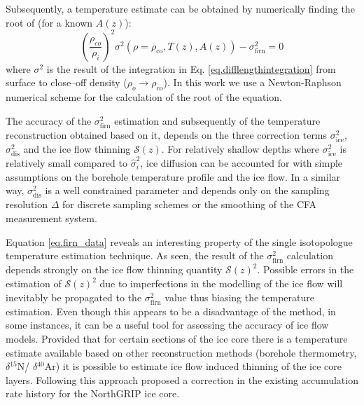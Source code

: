\documentclass[11pt, draftcls, onecolumn]{IEEEtran} %
\numberwithin{equation}{section}
\numberwithin{table}{section}
\numberwithin{figure}{section}
\newcommand{\delN}{$\delta{}^{15}\mathrm{N}$}
\newcommand{\delAr}{$\delta{}^{40}\mathrm{Ar}$}
\begin{document}
Subsequently, a temperature estimate can be obtained by numerically finding the root of (for a known $A(z)$):
\begin{equation}
\label{eq:T_reconstruction}
\left(\frac{\rho_{co}}{\rho_i} \right)^2  \sigma^2(\rho = \rho_{\mathrm{co}},T(z), A(z)) - \sigma^2_\text{firn} = 0 
\end{equation}
where $\sigma^2$ is the result of the integration in Eq. \ref{eq.difflengthintegration} from surface to 
close--off density ($\rho_o  \rightarrow \rho_{\mathrm{co}}$). In this work we use a Newton-Raphson numerical scheme 
\citep{RECIPES} for the calculation of the root of the equation.



The accuracy of the $\sigma^2_\text{firn}$ estimation and subsequently 
of the temperature reconstruction 
obtained based on it, depends on the three correction terms  $\sigma^2_{\mathrm{ice}}$, 
$\sigma^2_{\mathrm{dis}}$ and the ice flow thinning $\mathcal{S}(z)$. For relatively shallow depths 
where $\sigma^2_{\mathrm{ice}}$
is relatively small compared to $\widehat{\sigma}_i^2$, ice diffusion can be accounted for with 
simple assumptions on the  borehole temperature profile and the ice flow. 
In a similar way, 
$\sigma^2_{\mathrm{dis}}$ is a well constrained parameter and depends only on the sampling
resolution $\Delta$ for discrete sampling schemes or the smoothing of the CFA measurement system.


Equation \ref{eq.firn_data} reveals an interesting property of the single isotopologue temperature estimation
technique. As seen, the result of the $\sigma^2_{\mathrm{firn}}$ calculation depends strongly on the 
ice flow thinning quantity $\mathcal{S}(z)^2$. Possible errors in the estimation of $\mathcal{S}(z)^2$ due to imperfections
in the modelling of the ice flow will inevitably be propagated to the $\sigma^2_{\mathrm{firn}}$ value
thus biasing the temperature estimation. Even though this appears to be a disadvantage of the method,
in some instances, it can be a useful tool for assessing the accuracy of ice flow models. 
Provided that for certain sections of the ice core there is a temperature estimate available based on 
other reconstruction methods  (borehole thermometry, \delN / \delAr) it is possible to estimate 
ice flow induced thinning of the ice core layers. Following this approach \cite{Gkinis2014} proposed
a correction in the existing accumulation rate history for the NorthGRIP ice core.
\end{document}
